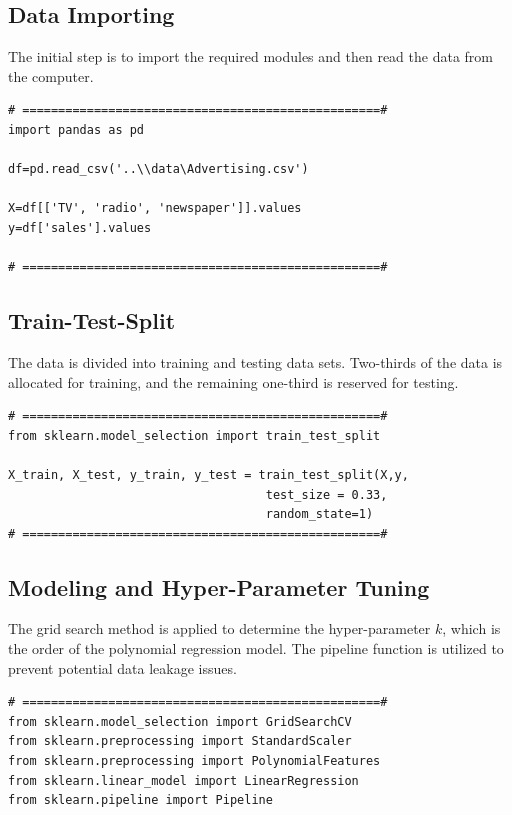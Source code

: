 {\subsection{Data Importing}
The initial step is to import the required modules and then read the data from the computer.

\begin{lstlisting}
# ==================================================#
import pandas as pd

df=pd.read_csv('..\\data\Advertising.csv')

X=df[['TV', 'radio', 'newspaper']].values
y=df['sales'].values

# ==================================================#
\end{lstlisting}

\newpage
\subsection{Train-Test-Split}
The data is divided into training and testing data sets. Two-thirds of the data is allocated for training, and the remaining one-third is reserved for testing.
\begin{lstlisting}
# ==================================================#
from sklearn.model_selection import train_test_split

X_train, X_test, y_train, y_test = train_test_split(X,y,
                                    test_size = 0.33,
                                    random_state=1)
# ==================================================#
\end{lstlisting}

\newpage
\subsection{Modeling and Hyper-Parameter Tuning}
The grid search method is applied to determine the hyper-parameter $k$, which is the order of the polynomial regression model. The pipeline function is utilized to prevent potential data leakage issues.

\begin{lstlisting}
# ==================================================#
from sklearn.model_selection import GridSearchCV
from sklearn.preprocessing import StandardScaler
from sklearn.preprocessing import PolynomialFeatures
from sklearn.linear_model import LinearRegression
from sklearn.pipeline import Pipeline


\end{lstlisting}}
